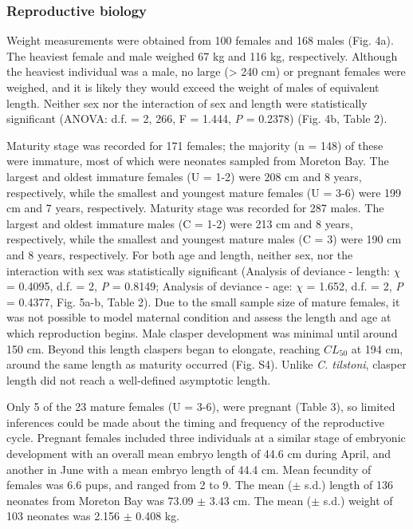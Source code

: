 \documentclass[]{article}
\begin{document}
\subsubsection{Reproductive biology}\label{reproductive-biology-1}

Weight measurements were obtained from 100 females and 168 males (Fig.
4a). The heaviest female and male weighed 67 kg and 116 kg,
respectively. Although the heaviest individual was a male, no large
(\textgreater{} 240 cm) or pregnant females were weighed, and it is
likely they would exceed the weight of males of equivalent length.
Neither sex nor the interaction of sex and length were statistically
significant (ANOVA: d.f. = 2, 266, F = 1.444, \emph{P} = 0.2378) (Fig.
4b, Table 2).

Maturity stage was recorded for 171 females; the majority (n = 148) of
these were immature, most of which were neonates sampled from Moreton
Bay. The largest and oldest immature females (U = 1-2) were 208 cm and 8
years, respectively, while the smallest and youngest mature females (U =
3-6) were 199 cm and 7 years, respectively. Maturity stage was recorded
for 287 males. The largest and oldest immature males (C = 1-2) were 213
cm and 8 years, respectively, while the smallest and youngest mature
males (C = 3) were 190 cm and 8 years, respectively. For both age and
length, neither sex, nor the interaction with sex was statistically
significant (Analysis of deviance - length: \(\chi\) = 0.4095, d.f. = 2,
\emph{P} = 0.8149; Analysis of deviance - age: \(\chi\) = 1.652, d.f. =
2, \emph{P} = 0.4377, Fig. 5a-b, Table 2). Due to the small sample size
of mature females, it was not possible to model maternal condition and
assess the length and age at which reproduction begins. Male clasper
development was minimal until around 150 cm. Beyond this length claspers
began to elongate, reaching \(CL_{50}\) at 194 cm, around the same
length as maturity occurred (Fig. S4). Unlike \emph{C. tilstoni},
clasper length did not reach a well-defined asymptotic length.

Only 5 of the 23 mature females (U = 3-6), were pregnant (Table 3), so
limited inferences could be made about the timing and frequency of the
reproductive cycle. Pregnant females included three individuals at a
similar stage of embryonic development with an overall mean embryo
length of 44.6 cm during April, and another in June with a mean embryo
length of 44.4 cm. Mean fecundity of females was 6.6 pups, and ranged
from 2 to 9. The mean (\(\pm\) s.d.) length of 136 neonates from Moreton
Bay was 73.09 \(\pm\) 3.43 cm. The mean (\(\pm\) s.d.) weight of 103
neonates was 2.156 \(\pm\) 0.408 kg.
\end{document}
